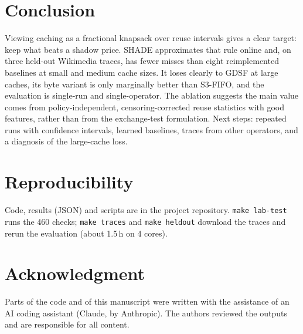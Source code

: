 \documentclass[conference]{IEEEtran}
\begin{document}
\section{Conclusion}
Viewing caching as a fractional knapsack over reuse intervals gives a clear target: keep what beats a shadow price.
SHADE approximates that rule online and, on three held-out Wikimedia traces, has fewer misses than eight
reimplemented baselines at small and medium cache sizes. It loses clearly to GDSF at large caches, its byte variant
is only marginally better than S3-FIFO, and the evaluation is single-run and single-operator. The ablation suggests
the main value comes from policy-independent, censoring-corrected reuse statistics with good features, rather than
from the exchange-test formulation. Next steps: repeated runs with confidence intervals, learned baselines, traces
from other operators, and a diagnosis of the large-cache loss.

\section*{Reproducibility}
Code, results (JSON) and scripts are in the project repository. \texttt{make lab-test} runs the 460 checks;
\texttt{make traces} and \texttt{make heldout} download the traces and rerun the evaluation (about 1.5\,h on 4 cores).

\section*{Acknowledgment}
Parts of the code and of this manuscript were written with the assistance of an AI coding assistant (Claude, by
Anthropic). The authors reviewed the outputs and are responsible for all content.
\end{document}
